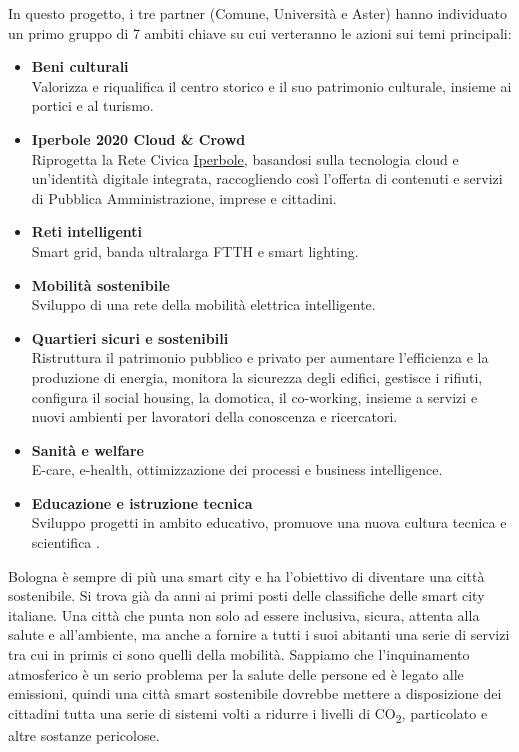 In questo progetto, i tre partner (Comune, Università e Aster) hanno individuato un primo gruppo di 7 ambiti chiave su cui verteranno le azioni sui temi principali:
\begin{itemize}
    \item \textbf{Beni culturali}\\
    Valorizza e riqualifica il centro storico e il suo patrimonio culturale, insieme ai portici e al turismo.
    \item \textbf{Iperbole 2020 Cloud \& Crowd}\\
    Riprogetta la Rete Civica \href{https://www.comune.bologna.it/notizie/wireless}{Iperbole}, basandosi sulla tecnologia cloud e un'identità digitale integrata, raccogliendo così l'offerta di contenuti e servizi di Pubblica Amministrazione, imprese e cittadini.
    \item \textbf{Reti intelligenti}\\
    Smart grid, banda ultralarga FTTH e smart lighting.
    \item \textbf{Mobilità sostenibile}\\
    Sviluppo di una rete della mobilità elettrica intelligente.
    \item \textbf{Quartieri sicuri e sostenibili}\\
    Ristruttura il patrimonio pubblico e privato per aumentare l'efficienza e la produzione di energia, monitora la sicurezza degli edifici, gestisce i rifiuti, configura il social housing, la domotica, il co-working, insieme a servizi e nuovi ambienti per lavoratori della conoscenza e ricercatori.
    \item \textbf{Sanità e welfare}\\
    E-care, e-health, ottimizzazione dei processi e business intelligence.
    \item \textbf{Educazione e istruzione tecnica}\\
    Sviluppo progetti in ambito educativo, promuove una nuova cultura tecnica e scientifica \cite{Bologna_Smart_City}.
\end{itemize}

Bologna è sempre di più una smart city e ha l'obiettivo di diventare una città sostenibile. Si trova già da anni ai primi posti delle classifiche delle smart city italiane. Una città che punta non solo ad essere inclusiva, sicura, attenta alla salute e all'ambiente, ma anche a fornire a tutti i suoi abitanti una serie di servizi tra cui in primis ci sono quelli della mobilità. Sappiamo che l'inquinamento atmosferico è un serio problema per la salute delle persone ed è legato alle emissioni, quindi una città smart sostenibile dovrebbe mettere a disposizione dei cittadini tutta una serie di sistemi volti a ridurre i livelli di CO\textsubscript{2}, particolato e altre sostanze pericolose.


